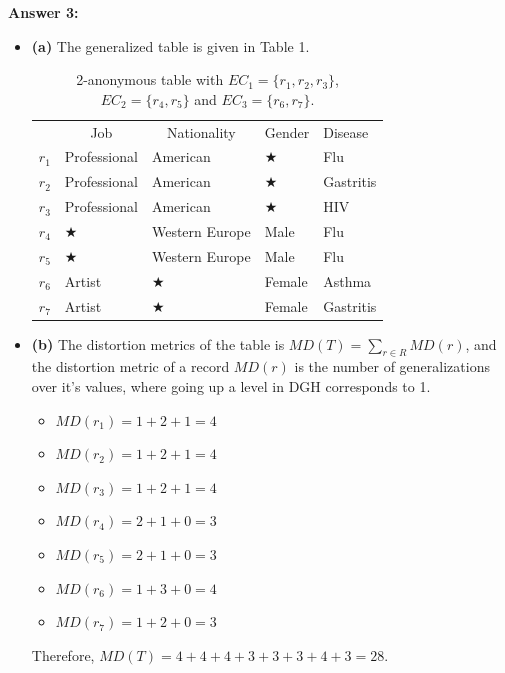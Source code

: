 \documentclass[12pt,reqno]{amsart}
\begin{document}
\newpage
\textbf{Answer 3:}
\begin{itemize}[label=]
\item  \textbf{(a)} The generalized table is given in Table 1.
\begin{table}[ht]
\begin{tabular}{l|l|l|l|l|}
\cline{2-5}
\multicolumn{1}{c|}{} & \multicolumn{1}{c|}{Job} & \multicolumn{1}{c|}{Nationality} & Gender & Disease \\ \cline{2-5} 
$r_1$ & Professional & American       & $\bigstar$    & Flu       \\ \cline{2-5} 
$r_2$ & Professional & American       & $\bigstar$    & Gastritis \\ \cline{2-5} 
$r_3$ & Professional & American       & $\bigstar$    & HIV       \\ \cline{2-5} 
$r_4$ & $\bigstar$          & Western Europe & Male   & Flu       \\ \cline{2-5} 
$r_5$ & $\bigstar$          & Western Europe & Male   & Flu       \\ \cline{2-5} 
$r_6$ & Artist       & $\bigstar$            & Female & Asthma    \\ \cline{2-5} 
$r_7$ & Artist       & $\bigstar$            & Female & Gastritis \\ \cline{2-5} 
\end{tabular}
\caption{2-anonymous table with $EC_1 = \{r_1, r_2, r_3\}$, $EC_2=\{r_4, r_5\}$ and $EC_3 = \{r_6, r_7\}$.}
\label{tab:q3}
\end{table}

\item  \textbf{(b)} The distortion metrics of the table is $MD(T) = \sum_{r \in R}MD(r)$, and the distortion metric of a record $MD(r)$ is the number of generalizations over it's values, where going up a level in DGH corresponds to 1.
\begin{itemize}[label=]
	\item $MD(r_1) = 1 + 2 + 1 = 4$ 
	\item $MD(r_2) = 1 + 2 + 1 = 4$
	\item $MD(r_3) = 1 + 2 + 1 = 4$
	\item $MD(r_4) = 2 + 1 + 0 = 3$
	\item $MD(r_5) = 2 + 1 + 0 = 3$
	\item $MD(r_6) = 1 + 3 + 0 = 4$
	\item $MD(r_7) = 1 + 2 + 0 = 3$
\end{itemize}
Therefore, $MD(T) = 4 + 4 + 4 + 3 + 3 + 3 + 4 + 3 = 28$.


\end{itemize}
\end{document}
